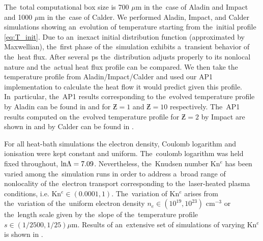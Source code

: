 
The~total computational box size is 700 $\mu$m in the~case
of Aladin and Impact and 1000 $\mu$m in the~case of Calder.
We performed Aladin, Impact, and Calder simulations showing an~evolution of
temperature starting from the~initial profile \eqref{eq:T_init}. 
Due to an~inexact initial distribution function (approximated by Maxwellian),
the~first phase of the~simulation exhibits a~transient behavior of the~heat
flux. After several ps the~distribution adjusts properly to its nonlocal nature
and the~actual heat flux profile can be compared. 
We then take the temperature profile from Aladin/Impact/Calder and used 
our AP1 implementation to calculate the heat flow
it would predict given this profile. In~particular, the~AP1 results 
corresponding to the~evolved temperature profile by Aladin can be found
in  and  for 
$\Zbar = 1$ and $\Zbar = 10$ respectively. The~AP1 results computed on
the~evolved temperature profile for $\Zbar = 2$ by Impact are shown in 
 and by Calder can be found in 
.

For all heat-bath simulations the electron density, Coulomb logarithm and 
ionisation were kept constant and uniform.
The~coulomb logarithm was held fixed throughout, 
$\text{ln}\Lambda = 7.09$.
Nevertheless, the~Knudsen number Kn$^e$ has been varied among the~simulation 
runs in order to address a~broad range of nonlocality of 
the~electron transport corresponding 
to the~laser-heated plasma conditions, i.e. Kn$^e \in (0.0001, 1)$. 
The~variation of Kn$^e$ arises from the~variation
of the~uniform electron density $n_e \in (10^{19}, 10^{23})$ cm$^{-3}$ or 
the~length scale given by the~slope of the~temperature profile 
$s \in (1/2500, 1/25) \mu$m. Results of an~extensive set of simulations of
varying Kn$^e$ is shown in .
 
